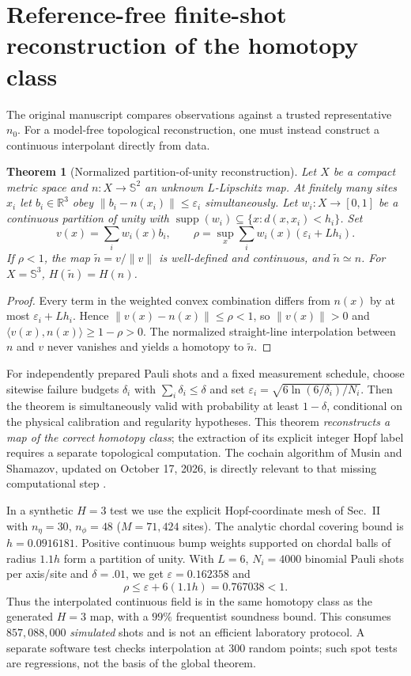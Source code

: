 \documentclass[aps,prd,onecolumn,notitlepage,11pt,superscriptaddress,longbibliography]{revtex4-2}
\newtheorem{theorem}{Theorem}
\newcommand{\Sph}{\mathbb S}
\begin{document}
\section{Reference-free finite-shot reconstruction of the homotopy class}
The original manuscript compares observations against a trusted
representative $n_0$. For a model-free topological reconstruction, one
must instead construct a continuous interpolant directly from data.
\begin{theorem}[Normalized partition-of-unity reconstruction]\label{th:free}
Let $X$ be a compact metric space and $n:X\to\Sph^2$ an unknown
$L$-Lipschitz map. At finitely many sites $x_i$ let $b_i\in\mathbb R^3$
obey $\|b_i-n(x_i)\|\le\varepsilon_i$ simultaneously.
Let $w_i:X\to[0,1]$ be a continuous partition of unity with
$\operatorname{supp}(w_i)\subseteq\{x:d(x,x_i)<h_i\}$.
Set
\begin{equation}
 v(x)=\sum_i w_i(x)b_i,\qquad
 \rho=\sup_x\sum_i w_i(x)(\varepsilon_i+Lh_i).
\end{equation}
If $\boxed{\rho<1}$, the map $\widetilde n=v/\|v\|$ is
well-defined and continuous, and $\widetilde n\simeq n$.
For $X=\Sph^3$, $H(\widetilde n)=H(n)$.
\end{theorem}
\begin{proof}
Every term in the weighted convex combination differs from $n(x)$
by at most $\varepsilon_i+Lh_i$. Hence
$\|v(x)-n(x)\|\le\rho<1$, so $\|v(x)\|>0$ and
$\langle v(x),n(x)\rangle\ge1-\rho>0$.
The normalized straight-line interpolation between $n$ and $v$
never vanishes and yields a homotopy to $\widetilde n$.
\end{proof}

For independently prepared Pauli shots and a fixed measurement
schedule, choose sitewise failure budgets $\delta_i$ with
$\sum_i\delta_i\le\delta$ and set
$\varepsilon_i=\sqrt{6\ln(6/\delta_i)/N_i}$.
Then the theorem is simultaneously valid with probability at least
$1-\delta$, conditional on the physical calibration and regularity
hypotheses. This theorem \emph{reconstructs a map of the correct
homotopy class}; the extraction of its explicit integer Hopf label
requires a separate topological computation. The cochain algorithm
of Musin and Shamazov, updated on October 17, 2026, is directly
relevant to that missing computational step \cite{MusinShamazov2026}.

In a synthetic $H=3$ test we use the explicit Hopf-coordinate mesh
of Sec.~II with $n_\eta=30$, $n_\phi=48$ ($M=71{,}424$ sites).
The analytic chordal covering bound is $h=0.0916181$.
Positive continuous bump weights supported on chordal balls of
radius $1.1h$ form a partition of unity. With $L=6$,
$N_i=4000$ binomial Pauli shots per axis/site and $\delta=.01$,
we get $\varepsilon=0.162358$ and
\begin{equation}
\boxed{\rho\le\varepsilon+6(1.1h)=0.767038<1.}
\end{equation}
Thus the interpolated continuous field is in the same homotopy class
as the generated $H=3$ map, with a $99\%$ frequentist soundness
bound. This consumes $857{,}088{,}000$ \emph{simulated} shots
and is not an efficient laboratory protocol.
A separate software test checks interpolation at 300 random
points; such spot tests are regressions, not the basis of the
global theorem.
\end{document}
